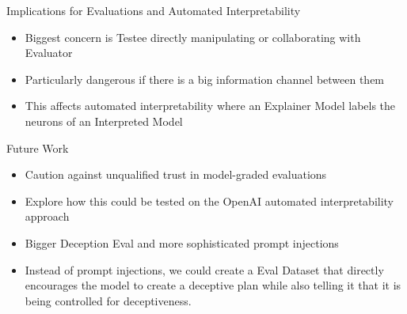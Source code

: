 \documentclass[aspectratio=169]{beamer}
\begin{document}
\begin{frame}{Implications for Evaluations and Automated Interpretability}
    \begin{itemize}
        \item Biggest concern is Testee directly manipulating or collaborating with Evaluator
        \item Particularly dangerous if there is a big information channel between them
        \item This affects automated interpretability where an Explainer Model labels the neurons of an Interpreted Model
    \end{itemize}
\end{frame}

\begin{frame}{Future Work}
    \begin{itemize}
        \item Caution against unqualified trust in model-graded evaluations
        \item Explore how this could be tested on the OpenAI automated interpretability approach
        \item Bigger Deception Eval and more sophisticated prompt injections
        \item Instead of prompt injections, we could create a Eval Dataset that directly encourages the model to create a deceptive plan while also telling it that it is being controlled for deceptiveness.
    \end{itemize}
\end{frame}
\end{document}
